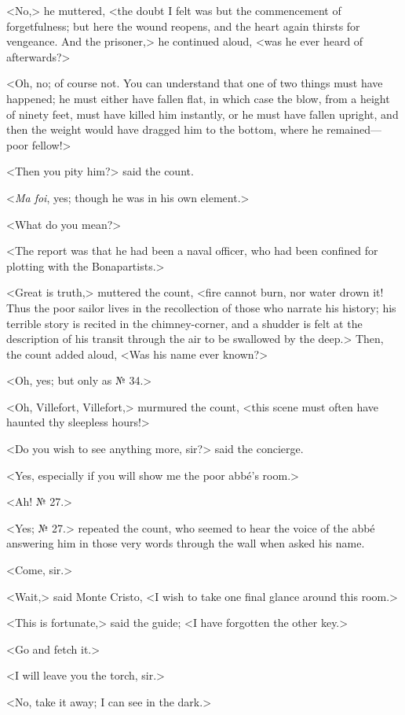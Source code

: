  <No,> he muttered, <the doubt I felt was but the commencement of forgetfulness; but here the wound reopens, and the heart again thirsts for vengeance. And the prisoner,> he continued aloud, <was he ever heard of afterwards?> 

 <Oh, no; of course not. You can understand that one of two things must have happened; he must either have fallen flat, in which case the blow, from a height of ninety feet, must have killed him instantly, or he must have fallen upright, and then the weight would have dragged him to the bottom, where he remained—poor fellow!> 

 <Then you pity him?> said the count. 

 <\textit{Ma foi}, yes; though he was in his own element.> 

 <What do you mean?> 

 <The report was that he had been a naval officer, who had been confined for plotting with the Bonapartists.> 

 <Great is truth,> muttered the count, <fire cannot burn, nor water drown it! Thus the poor sailor lives in the recollection of those who narrate his history; his terrible story is recited in the chimney-corner, and a shudder is felt at the description of his transit through the air to be swallowed by the deep.> Then, the count added aloud, <Was his name ever known?> 

 <Oh, yes; but only as № 34.> 

 <Oh, Villefort, Villefort,> murmured the count, <this scene must often have haunted thy sleepless hours!> 

 <Do you wish to see anything more, sir?> said the concierge. 

 <Yes, especially if you will show me the poor abbé's room.> 

 <Ah! № 27.> 

 <Yes; № 27.> repeated the count, who seemed to hear the voice of the abbé answering him in those very words through the wall when asked his name. 

 <Come, sir.> 

 <Wait,> said Monte Cristo, <I wish to take one final glance around this room.> 

 <This is fortunate,> said the guide; <I have forgotten the other key.> 

 <Go and fetch it.> 

 <I will leave you the torch, sir.> 

 <No, take it away; I can see in the dark.> 

